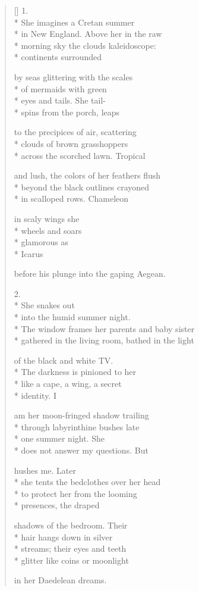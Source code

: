 \label{ch:archaeopteryx}
\settowidth{\versewidth}{does not answer my questions. \qquad  \qquad But}
\begin{verse}[\versewidth]
1. \\*
She imagines a Cretan summer\\*
in New England.  Above her in the raw\\*
morning sky the clouds kaleidoscope:\\*
continents surrounded

by seas glittering with the scales\\*
of mermaids with green\\*
eyes and tails. \qquad  \qquad She tail-\\*
spins from the porch, leaps

to the precipices of air, scattering\\*
clouds of brown grasshoppers\\*
across the scorched lawn. \qquad Tropical

and lush, the colors of her feathers flush\\*
beyond the black outlines crayoned\\*
in scalloped rows. \qquad Chameleon

 \qquad in scaly wings she\\*
 \qquad  wheels and soars\\*
 \qquad    glamorous as\\*
 \qquad         Icarus 

before his plunge into the gaping Aegean.

2.\\*
She snakes out\\*
into the humid summer night.\\*
The window frames her parents and baby sister\\*
gathered in the living room, bathed in the light

of the black and white TV.\\*
The darkness is pinioned to her\\*
like a cape, a wing, a secret\\*
identity. \qquad I

am her moon-fringed shadow trailing\\*
through labyrinthine bushes late\\*
one summer night. \qquad She \\*
does not answer my questions. \qquad  \qquad But

hushes me.  Later\\*
she tents the bedclothes over her head\\*
to protect her from the looming\\*
presences, the draped

shadows of the bedroom.  Their\\*
hair hangs down in silver\\*
streams; their eyes and teeth\\*
glitter like coins or moonlight

in her Daedelean dreams.
\end{verse}
